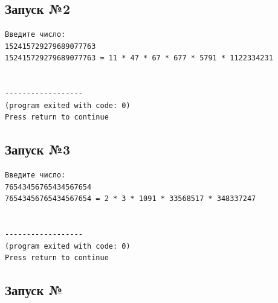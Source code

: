 \documentclass[a4paper,12pt]{article} %
\begin{document}
\subsection*{Запуск №2}
\begin{verbatim}
Введите число:
152415729279689077763
152415729279689077763 = 11 * 47 * 67 * 677 * 5791 * 1122334231


------------------
(program exited with code: 0)
Press return to continue
\end{verbatim}

\subsection*{Запуск №3}
\begin{verbatim}
Введите число:
76543456765434567654
76543456765434567654 = 2 * 3 * 1091 * 33568517 * 348337247


------------------
(program exited with code: 0)
Press return to continue
\end{verbatim}





\subsection*{Запуск №}
\begin{verbatim}

\end{verbatim}

\printbibliography
\end{document}
